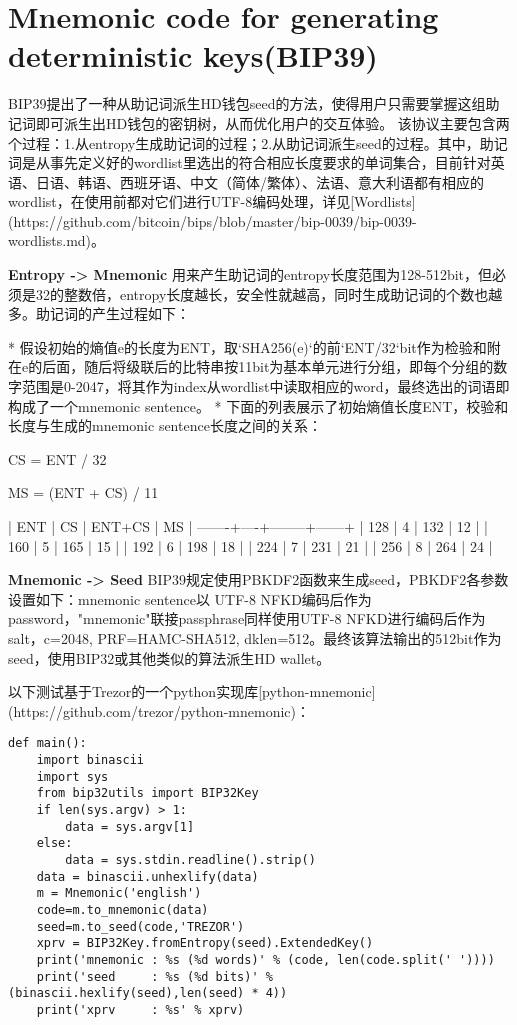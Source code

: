 \section{Mnemonic code for generating deterministic keys(BIP39)}
BIP39提出了一种从助记词派生HD钱包seed的方法，使得用户只需要掌握这组助记词即可派生出HD钱包的密钥树，从而优化用户的交互体验。  
该协议主要包含两个过程：1.从entropy生成助记词的过程；2.从助记词派生seed的过程。其中，助记词是从事先定义好的wordlist里选出的符合相应长度要求的单词集合，目前针对英语、日语、韩语、西班牙语、中文（简体/繁体）、法语、意大利语都有相应的wordlist，在使用前都对它们进行UTF-8编码处理，详见[Wordlists](https://github.com/bitcoin/bips/blob/master/bip-0039/bip-0039-wordlists.md)。


\textbf{Entropy -> Mnemonic}
用来产生助记词的entropy长度范围为128-512bit，但必须是32的整数倍，entropy长度越长，安全性就越高，同时生成助记词的个数也越多。助记词的产生过程如下：

* 假设初始的熵值e的长度为ENT，取`SHA256(e)`的前`ENT/32`bit作为检验和附在e的后面，随后将级联后的比特串按11bit为基本单元进行分组，即每个分组的数字范围是0-2047，将其作为index从wordlist中读取相应的word，最终选出的词语即构成了一个mnemonic sentence。
* 下面的列表展示了初始熵值长度ENT，校验和长度与生成的mnemonic sentence长度之间的关系：


		CS = ENT / 32
		
		MS = (ENT + CS) / 11
		
		|  ENT  | CS | ENT+CS |  MS  |
		-------+----+--------+------+
		|  128  |  4 |   132  |  12  |
		|  160  |  5 |   165  |  15  |
		|  192  |  6 |   198  |  18  |
		|  224  |  7 |   231  |  21  |
		|  256  |  8 |   264  |  24  |


\textbf{Mnemonic -> Seed}
BIP39规定使用PBKDF2函数来生成seed，PBKDF2各参数设置如下：mnemonic sentence以 UTF-8 NFKD编码后作为password，"mnemonic"联接passphrase同样使用UTF-8 NFKD进行编码后作为salt，c=2048, PRF=HAMC-SHA512, dklen=512。最终该算法输出的512bit作为 seed，使用BIP32或其他类似的算法派生HD wallet。


以下测试基于Trezor的一个python实现库[python-mnemonic](https://github.com/trezor/python-mnemonic)：

\begin{lstlisting}
def main():
    import binascii
    import sys
    from bip32utils import BIP32Key
    if len(sys.argv) > 1:
        data = sys.argv[1]
    else:
        data = sys.stdin.readline().strip()
    data = binascii.unhexlify(data)
    m = Mnemonic('english')
    code=m.to_mnemonic(data)
    seed=m.to_seed(code,'TREZOR')
    xprv = BIP32Key.fromEntropy(seed).ExtendedKey()
    print('mnemonic : %s (%d words)' % (code, len(code.split(' '))))
    print('seed     : %s (%d bits)' % (binascii.hexlify(seed),len(seed) * 4))
    print('xprv     : %s' % xprv)
\end{lstlisting}

